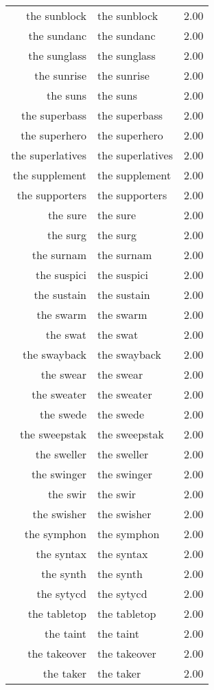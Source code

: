 \begin{table}[ht]
\begin{tabular}{rlr}
  the sunblock & the sunblock & 2.00 \\ 
  the sundanc & the sundanc & 2.00 \\ 
  the sunglass & the sunglass & 2.00 \\ 
  the sunrise & the sunrise & 2.00 \\ 
  the suns & the suns & 2.00 \\ 
  the superbass & the superbass & 2.00 \\ 
  the superhero & the superhero & 2.00 \\ 
  the superlatives & the superlatives & 2.00 \\ 
  the supplement & the supplement & 2.00 \\ 
  the supporters & the supporters & 2.00 \\ 
  the sure & the sure & 2.00 \\ 
  the surg & the surg & 2.00 \\ 
  the surnam & the surnam & 2.00 \\ 
  the suspici & the suspici & 2.00 \\ 
  the sustain & the sustain & 2.00 \\ 
  the swarm & the swarm & 2.00 \\ 
  the swat & the swat & 2.00 \\ 
  the swayback & the swayback & 2.00 \\ 
  the swear & the swear & 2.00 \\ 
  the sweater & the sweater & 2.00 \\ 
  the swede & the swede & 2.00 \\ 
  the sweepstak & the sweepstak & 2.00 \\ 
  the sweller & the sweller & 2.00 \\ 
  the swinger & the swinger & 2.00 \\ 
  the swir & the swir & 2.00 \\ 
  the swisher & the swisher & 2.00 \\ 
  the symphon & the symphon & 2.00 \\ 
  the syntax & the syntax & 2.00 \\ 
  the synth & the synth & 2.00 \\ 
  the sytycd & the sytycd & 2.00 \\ 
  the tabletop & the tabletop & 2.00 \\ 
  the taint & the taint & 2.00 \\ 
  the takeover & the takeover & 2.00 \\ 
  the taker & the taker & 2.00 \\ 

\end{tabular}
\end{table}
